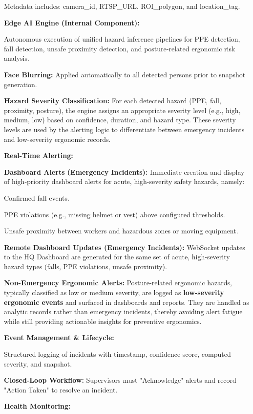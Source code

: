 Metadata includes: camera\_id, RTSP\_URL, ROI\_polygon, and location\_tag.

\textbf{Edge AI Engine (Internal Component):}

Autonomous execution of unified hazard inference pipelines for PPE detection, fall detection, unsafe proximity detection, and posture-related ergonomic risk analysis.

\textbf{Face Blurring:} Applied automatically to all detected persons prior to snapshot generation.

\textbf{Hazard Severity Classification:} For each detected hazard (PPE, fall, proximity, posture), the engine assigns an appropriate severity level (e.g., high, medium, low) based on confidence, duration, and hazard type. These severity levels are used by the alerting logic to differentiate between emergency incidents and low-severity ergonomic records.

\textbf{Real-Time Alerting:}

\textbf{Dashboard Alerts (Emergency Incidents):} Immediate creation and display of high-priority dashboard alerts for acute, high-severity safety hazards, namely:

Confirmed fall events.

PPE violations (e.g., missing helmet or vest) above configured thresholds.

Unsafe proximity between workers and hazardous zones or moving equipment.

\textbf{Remote Dashboard Updates (Emergency Incidents):} WebSocket updates to the HQ Dashboard are generated for the same set of acute, high-severity hazard types (falls, PPE violations, unsafe proximity).

\textbf{Non-Emergency Ergonomic Alerts:} Posture-related ergonomic hazards, typically classified as low or medium severity, are logged as \textbf{low-severity ergonomic events} and surfaced in dashboards and reports. They are handled as analytic records rather than emergency incidents, thereby avoiding alert fatigue while still providing actionable insights for preventive ergonomics.

\textbf{Event Management \& Lifecycle:}

Structured logging of incidents with timestamp, confidence score, computed severity, and snapshot.

\textbf{Closed-Loop Workflow:} Supervisors must "Acknowledge" alerts and record "Action Taken" to resolve an incident.

\textbf{Health Monitoring:}

